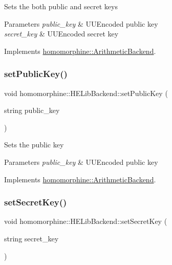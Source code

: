 Sets the both public and secret keys


\begin{DoxyParams}{Parameters}
{\em public\+\_\+key} & U\+U\+Encoded public key \\
\hline
{\em secret\+\_\+key} & U\+U\+Encoded secret key \\
\hline
\end{DoxyParams}


Implements \mbox{\hyperlink{classhomomorphine_1_1_arithmetic_backend_ac78f4b42dce3dce23edd81dba60b16c8}{homomorphine\+::\+Arithmetic\+Backend}}.

\mbox{\label{classhomomorphine_1_1_h_e_lib_backend_af54dc3990d99aab69c97172d0e5b4e51}} 
\subsubsection{\texorpdfstring{setPublicKey()}{setPublicKey()}}
{\footnotesize\ttfamily void homomorphine\+::\+H\+E\+Lib\+Backend\+::set\+Public\+Key (\begin{DoxyParamCaption}\item[{string}]{public\+\_\+key }\end{DoxyParamCaption})\hspace{0.3cm}{\ttfamily [virtual]}}

Sets the public key


\begin{DoxyParams}{Parameters}
{\em public\+\_\+key} & U\+U\+Encoded public key \\
\hline
\end{DoxyParams}


Implements \mbox{\hyperlink{classhomomorphine_1_1_arithmetic_backend_af2dd2c37ed1fcd56b58baa6cb3f14e8b}{homomorphine\+::\+Arithmetic\+Backend}}.

\mbox{\label{classhomomorphine_1_1_h_e_lib_backend_a483a6695be2d733d48e2180ffb25d053}} 
\subsubsection{\texorpdfstring{setSecretKey()}{setSecretKey()}}
{\footnotesize\ttfamily void homomorphine\+::\+H\+E\+Lib\+Backend\+::set\+Secret\+Key (\begin{DoxyParamCaption}\item[{string}]{secret\+\_\+key }\end{DoxyParamCaption})\hspace{0.3cm}{\ttfamily [virtual]}}


